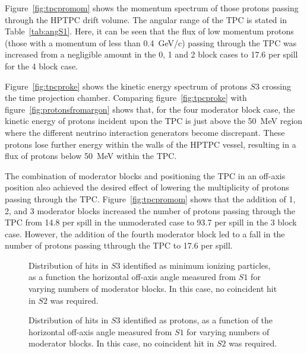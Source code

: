 Figure~\ref{fig:tpcpromom} shows the momentum spectrum of those protons passing through the HPTPC drift volume.
The angular range of the TPC is stated in Table~\ref{tab:angS1}.
Here, it can be seen that the flux of low momentum protons (those with a momentum of less than 0.4~GeV/c) passing through the TPC was increased from a negligible amount in the 0, 1 and 2 block cases to 17.6 per spill for the 4 block case.

Figure~\ref{fig:tpcproke} shows the kinetic energy spectrum of protons $\mathit{S3}$ crossing the time projection chamber.
Comparing figure~\ref{fig:tpcproke} with figure~\ref{fig:protonsfromargon} shows that, for the four moderator block case, the kinetic energy of protons incident upon the TPC is just above the 50~MeV region where the different neutrino interaction generators become discrepant.
These protons lose further energy within the walls of the HPTPC vessel, resulting in a flux of protons below 50~MeV within the TPC.

The combination of moderator blocks and positioning the TPC in an off-axis position also achieved the desired effect of lowering the multiplicity of protons passing through the TPC.
Figure~\ref{fig:tpcpromom} shows that the addition of 1, 2, and 3 moderator blocks increased the number of protons passing through the TPC from 14.8 per spill in the unmoderated case to 93.7 per spill in the 3 block case.
However, the addition of the fourth moderator block led to a fall in the number of protons passing tthrough the TPC to 17.6 per spill.
  
\begin{figure}[h]
  \begin{minipage}{0.48\textwidth}
    \begin{adjustbox}{max totalsize={\textwidth}{.35\textheight},center}
      
    \end{adjustbox}
    \caption{Distribution of hits in $\mathit{S3}$ identified as minimum ionizing particles, as a function the horizontal off-axis angle measured from $\mathit{S1}$ for varying numbers of moderator blocks. In this case, no coincident hit in $\mathit{S2}$ was required.}
    \label{fig:s1s3mips}
  \end{minipage}
  \hspace{0.3cm}
  \begin{minipage}{0.48\textwidth}
    \begin{adjustbox}{max totalsize={\textwidth}{.35\textheight},center}
      
    \end{adjustbox}
    \caption{Distribution of hits in $\mathit{S3}$ identified as protons, as a function of the horizontal off-axis angle measured from $\mathit{S1}$ for varying numbers of moderator blocks. In this case, no coincident hit in $\mathit{S2}$ was required.}
    \label{fig:s1s3protons}
  \end{minipage}
\end{figure}

